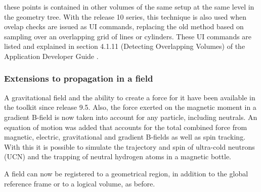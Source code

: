 these points is contained in other volumes of the same setup at the same level
in the geometry tree.  With the release 10 series, this technique is also used 
when ovelap checks are issued as UI commands, replacing the old method based on 
sampling over an overlapping grid of lines or cylinders.  These UI commands are 
listed and explained in section 4.1.11 (Detecting Overlapping Volumes) of the 
Application Developer Guide \cite{bib:AppDevGuide}.

\subsubsection{Extensions to propagation in a field}
A gravitational field and the ability to create a force for it have been 
available in the toolkit since release 9.5.  Also, the force exerted on the 
magnetic moment in a gradient B-field is now taken into account for any 
particle, including neutrals.  An equation of motion was added that accounts for
the total combined force from magnetic, electric, gravitational and gradient 
B-fields as well as spin tracking.  With this it is possible to simulate the 
trajectory and spin of ultra-cold neutrons (UCN) and the trapping of neutral 
hydrogen atoms in a magnetic bottle.

A field can now be registered to a geometrical region, in addition to the global
reference frame or to a logical volume, as before.  

